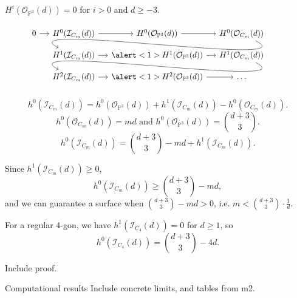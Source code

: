 \documentclass[UKenglish,aspectratio=169]{beamer}
\begin{document}
\begin{frame}[fragile]
    $H^i(\mathcal{O}_{\mathbb{P}^3}(d)) = 0$ for $i > 0$ and $d \geq -3$.
    \[
        \begin{tikzcd}[sep=small]
        0 \ar[r]
        & H^0(\mathcal{I}_{C_m}(d)) \ar[r]
        & H^0(\mathcal{O}_{\mathbb{P}^3}(d)) \ar[r]
        & H^0(\mathcal{O}_{C_m}(d)) \ar[controls={+(3,-1.5) and +(-3,1.5)}]{dll} \\
        {}
        & H^1(\mathcal{I}_{C_m}(d)) \ar[r]
        & \alert<1>{H^1(\mathcal{O}_{\mathbb{P}^3}(d))} \ar[r]
        & H^1(\mathcal{O}_{C_m}(d)) \ar[controls={+(3,-1.5) and +(-3,1.5)}]{dll} \\
        {}
        & H^2(\mathcal{I}_{C_m}(d)) \ar[r]
        & \alert<1>{H^2(\mathcal{O}_{\mathbb{P}^3}(d))} \ar[r]
        & \dots
        \end{tikzcd}
    \]

    \[h^0(\mathcal{I}_{C_m}(d)) = h^0(\mathcal{O}_{\mathbb{P}^3}(d)) + h^1(\mathcal{I}_{C_m}(d)) - h^0(\mathcal{O}_{C_m}(d)).\]
    \[h^0(\mathcal{O}_{C_m}(d)) = md \text{ and } h^0(\mathcal{O}_{\mathbb{P}^3}(d)) = \binom{d+3}{3}.\]
    \[h^0(\mathcal{I}_{C_m}(d)) = \binom{d+3}{3} - md + h^1(\mathcal{I}_{C_m}(d)).\]
\end{frame}

\begin{frame}
    Since $h^1(\mathcal{I}_{C_m}(d)) \geq 0$, 
    \[h^0(\mathcal{I}_{C_m}(d)) \geq \binom{d+3}{3} - md,\]
    and we can guarantee a surface when $\binom{d+3}{3} - md > 0$, i.e. $m < \binom{d+3}{3} \cdot \frac{1}{d}$.
\end{frame}

\begin{frame}
    \begin{example}
        For a regular 4-gon, we have $h^1(\mathcal{I}_{C_4}(d)) = 0$ for $d \geq 1$, so 
        \[h^0(\mathcal{I}_{C_4}(d)) = \binom{d+3}{3} - 4d.\] 
    \end{example}

    Include proof.
\end{frame}

\begin{frame}{Computational results}
    Include concrete limits, and tables from m2.
\end{frame}
\end{document}
